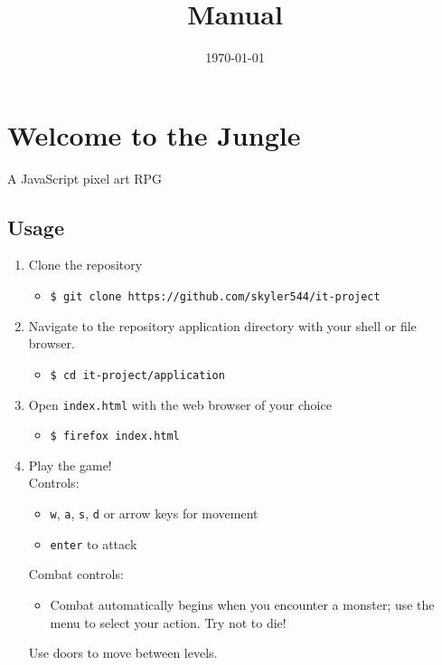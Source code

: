 \documentclass[11pt]{article}
\date{\today}
\title{Manual}
\begin{document}
\maketitle


\section{Welcome to the Jungle}
\label{sec:org84892e2}
A JavaScript pixel art RPG\\
\subsection{Usage}
\label{sec:org5b371fe}
\begin{enumerate}
\item Clone the repository\\
\begin{itemize}
\item \texttt{\$ git clone https://github.com/skyler544/it-project}\\
\end{itemize}
\item Navigate to the repository application directory with your shell or file browser.\\
\begin{itemize}
\item \texttt{\$ cd it-project/application}\\
\end{itemize}
\item Open \texttt{index.html} with the web browser of your choice\\
\begin{itemize}
\item \texttt{\$ firefox index.html}\\
\end{itemize}
\item Play the game!\\
Controls:\\
\begin{itemize}
\item \texttt{w}, \texttt{a}, \texttt{s}, \texttt{d} or arrow keys for movement\\
\item \texttt{enter} to attack\\
\end{itemize}
Combat controls:\\
\begin{itemize}
\item Combat automatically begins when you encounter a monster; use the menu to select your action. Try not to die!\\
\end{itemize}
Use doors to move between levels.\\
\end{enumerate}
\end{document}
